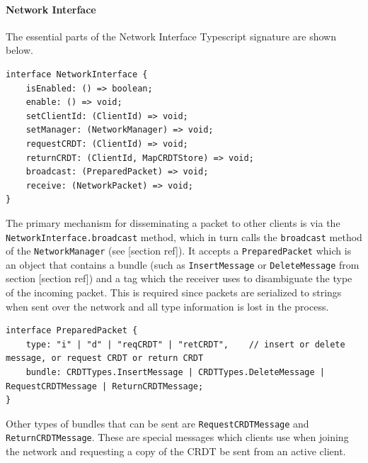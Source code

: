 \documentclass[12pt,a4paper,twoside,openright]{report}
\begin{document}
		\paragraph{Network Interface} The essential parts of the Network Interface Typescript signature are shown below.
		
\begin{lstlisting}[caption=NetworkInterface Type Signature (cleaned)]
interface NetworkInterface {
	isEnabled: () => boolean;
	enable: () => void;
	setClientId: (ClientId) => void;
	setManager: (NetworkManager) => void;
	requestCRDT: (ClientId) => void;
	returnCRDT: (ClientId, MapCRDTStore) => void;
	broadcast: (PreparedPacket) => void;
	receive: (NetworkPacket) => void;
}
\end{lstlisting}

		The primary mechanism for disseminating a packet to other clients is via the \lstinline|NetworkInterface.broadcast| method, which in turn calls the \lstinline|broadcast| method of the \lstinline|NetworkManager| (see [section ref]). It accepts a \lstinline|PreparedPacket| which is an object that contains a bundle (such as \lstinline|InsertMessage| or \lstinline|DeleteMessage| from section [section ref]) and a tag which the receiver uses to disambiguate the type of the incoming packet. This is required since packets are serialized to strings when sent over the network and all type information is lost in the process.
\begin{lstlisting}	
interface PreparedPacket {
	type: "i" | "d" | "reqCRDT" | "retCRDT",    // insert or delete message, or request CRDT or return CRDT
	bundle: CRDTTypes.InsertMessage | CRDTTypes.DeleteMessage | RequestCRDTMessage | ReturnCRDTMessage;
}
\end{lstlisting}
		
		Other types of bundles that can be sent are \lstinline|RequestCRDTMessage| and \lstinline|ReturnCRDTMessage|. These are special messages which clients use when joining the network and requesting a copy of the CRDT be sent from an active client.
		
\end{document}
